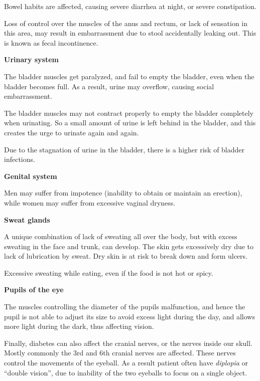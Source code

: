 { \item Bowel habits are affected, causing severe diarrhea at night, or severe constipation.

 \item Loss of control over the muscles of the anus and rectum, or lack of sensation in this area, may result in embarrassment due to stool accidentally leaking out. This is known as fecal incontinence.


 \item \textbf{Urinary system}
 \item The bladder muscles get paralyzed, and fail to empty the bladder, even when the bladder becomes full. As a result, urine may overflow, causing social embarrassment.

 \item The bladder muscles may not contract properly to empty the bladder completely when urinating. So a small amount of urine is left behind in the bladder, and this creates the urge to urinate again and again.

 \item Due to the stagnation of urine in the bladder, there is a higher risk of bladder infections.


 \item \textbf{Genital system}
 \item Men may suffer from impotence (inability to obtain or maintain an erection), while women may suffer from excessive vaginal dryness.


 \item \textbf{Sweat glands}
 \item A unique combination of lack of sweating all over the body, but with excess sweating in the face and trunk, can develop. The skin gets excessively dry due to lack of lubrication by sweat. Dry skin is at risk to break down and form ulcers.

 \item Excessive sweating while eating, even if the food is not hot or spicy.


 \item \textbf{Pupils of the eye}
 \item The muscles controlling the diameter of the pupils malfunction, and hence the pupil is not able to adjust its size to avoid excess light during the day, and allows more light during the dark, thus affecting vision.



Finally, diabetes can also affect the cranial nerves, or the nerves inside our skull. Mostly commonly the 3rd and 6th cranial nerves are affected. These nerves control the movements of the eyeball. As a result patient often have \textit{diplopia} or “double vision”, due to inability of the two eyeballs to focus on a single object.

}
